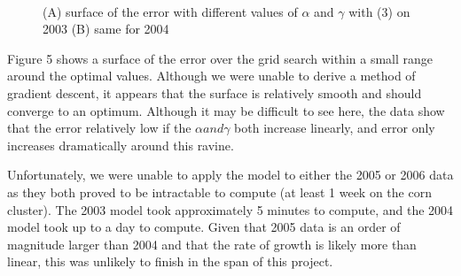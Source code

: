 \documentclass[11pt]{amsart}
\begin{document}
\begin{figure}
	\centering
	\\
	\caption{(A) surface of the error with different values of $\alpha$ and $\gamma$ with (3) on 2003 (B) same for 2004}
\end{figure}

Figure 5 shows a surface of the error over the grid search within a small range around the optimal values. Although we were unable to derive a method of gradient descent, it appears that the surface is relatively smooth and should converge to an optimum. Although it may be difficult to see here, the data show that the error relatively low if the $\alpha and \gamma$ both increase linearly, and error only increases dramatically around this ravine.

Unfortunately, we were unable to apply the model to either the 2005 or 2006 data as they both proved to be intractable to compute (at least 1 week on the corn cluster). The 2003 model took approximately 5 minutes to compute, and the 2004 model took up to a day to compute. Given that 2005 data is an order of magnitude larger than 2004 and that the rate of growth is likely more than linear, this was unlikely to finish in the span of this project.
\end{document}
